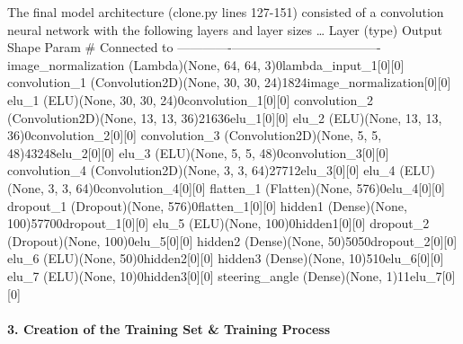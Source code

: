 \documentclass[11pt]{article}
\begin{document}
The final model architecture (clone.py lines 127-151) consisted of a
convolution neural network with the following layers and layer sizes
\ldots{} \textbar{}Layer (type) \textbar{} Output Shape \textbar{} Param
\# \textbar{} Connected to\textbar{}
\textbar{}-------------\textbar{}--------------\textbar{}---------\textbar{}-------------\textbar{}
\textbar{}image\_normalization (Lambda)\textbar{}(None, 64, 64,
3)\textbar{}0\textbar{}lambda\_input\_1{[}0{]}{[}0{]}\textbar{}
\textbar{}convolution\_1 (Convolution2D)\textbar{}(None, 30, 30,
24)\textbar{}1824\textbar{}image\_normalization{[}0{]}{[}0{]}\textbar{}
\textbar{}elu\_1 (ELU)\textbar{}(None, 30, 30,
24)\textbar{}0\textbar{}convolution\_1{[}0{]}{[}0{]}\textbar{}
\textbar{}convolution\_2 (Convolution2D)\textbar{}(None, 13, 13,
36)\textbar{}21636\textbar{}elu\_1{[}0{]}{[}0{]}\textbar{}
\textbar{}elu\_2 (ELU)\textbar{}(None, 13, 13,
36)\textbar{}0\textbar{}convolution\_2{[}0{]}{[}0{]}\textbar{}
\textbar{}convolution\_3 (Convolution2D)\textbar{}(None, 5, 5,
48)\textbar{}43248\textbar{}elu\_2{[}0{]}{[}0{]}\textbar{}
\textbar{}elu\_3 (ELU)\textbar{}(None, 5, 5,
48)\textbar{}0\textbar{}convolution\_3{[}0{]}{[}0{]}\textbar{}
\textbar{}convolution\_4 (Convolution2D)\textbar{}(None, 3, 3,
64)\textbar{}27712\textbar{}elu\_3{[}0{]}{[}0{]}\textbar{}
\textbar{}elu\_4 (ELU)\textbar{}(None, 3, 3,
64)\textbar{}0\textbar{}convolution\_4{[}0{]}{[}0{]}\textbar{}
\textbar{}flatten\_1 (Flatten)\textbar{}(None,
576)\textbar{}0\textbar{}elu\_4{[}0{]}{[}0{]}\textbar{}
\textbar{}dropout\_1 (Dropout)\textbar{}(None,
576)\textbar{}0\textbar{}flatten\_1{[}0{]}{[}0{]}\textbar{}
\textbar{}hidden1 (Dense)\textbar{}(None,
100)\textbar{}57700\textbar{}dropout\_1{[}0{]}{[}0{]}\textbar{}
\textbar{}elu\_5 (ELU)\textbar{}(None,
100)\textbar{}0\textbar{}hidden1{[}0{]}{[}0{]}\textbar{}
\textbar{}dropout\_2 (Dropout)\textbar{}(None,
100)\textbar{}0\textbar{}elu\_5{[}0{]}{[}0{]}\textbar{}
\textbar{}hidden2 (Dense)\textbar{}(None,
50)\textbar{}5050\textbar{}dropout\_2{[}0{]}{[}0{]}\textbar{}
\textbar{}elu\_6 (ELU)\textbar{}(None,
50)\textbar{}0\textbar{}hidden2{[}0{]}{[}0{]}\textbar{}
\textbar{}hidden3 (Dense)\textbar{}(None,
10)\textbar{}510\textbar{}elu\_6{[}0{]}{[}0{]}\textbar{}
\textbar{}elu\_7 (ELU)\textbar{}(None,
10)\textbar{}0\textbar{}hidden3{[}0{]}{[}0{]}\textbar{}
\textbar{}steering\_angle (Dense)\textbar{}(None,
1)\textbar{}11\textbar{}elu\_7{[}0{]}{[}0{]}\textbar{}

\hypertarget{creation-of-the-training-set-training-process}{%
\paragraph{3. Creation of the Training Set \& Training
Process}\label{creation-of-the-training-set-training-process}}
\end{document}
